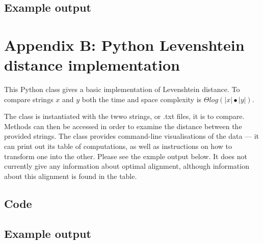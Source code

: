 \documentclass[a4paper,11pt,twoside,notitlepage]{article}
\begin{document}
\begin{appendices}
          
          \subsection{Example output}
          
          \clearpage
          \section{Appendix B: Python Levenshtein distance implementation}
          \label{levenshtein-implement}
          This Python class gives a basic implementation of
          Levenshtein distance. To compare strings $x$ and $y$ both
          the time and space complexity is
          ${\Theta}log(|x|{\bullet}|y|)$.

          The class is instantiated with the twwo strings, or .txt
          files, it is to compare. Methods can then be accessed in
          order to examine the distance between the provided
          strings. The class provides command-line visualisations of
          the data --- it can print out its table of computations, as
          well as instructions on how to transform one into the
          other. Please see the exmple output below. It does not
          currently give any information about optimal alignment,
          although information about this alignment is found in the
          table.
          \subsection{Code}
          
          \subsection{Example output}
        \end{appendices}
        
\end{document}
